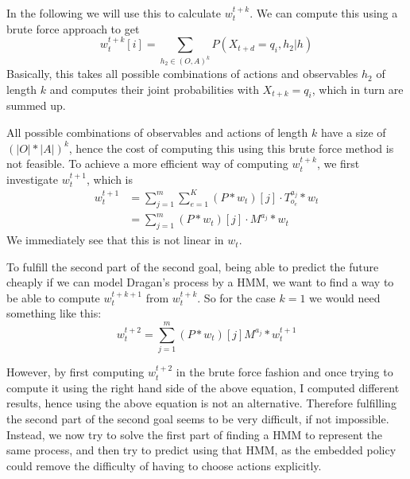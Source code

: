 \documentclass{article}
\theoremstyle{definition}
\begin{document}
In the following we will use this to calculate $w_t^{t+k}$. We can compute this using a brute force approach to get 
\[
w_t^{t+k}[i]=\sum\limits_{h_2 \in (O,A)^k} P(X_{t+d}=q_i,h_2|h) 
\]
Basically, this takes all possible combinations of actions and observables $h_2$ of length $k$ and computes their joint probabilities with $X_{t+k}=q_i$, which in turn are summed up. 

All possible combinations of observables and actions of length $k$ have a size of $(|O|*|A|)^k$, hence the cost of computing this using this brute force method is not feasible. 
To achieve a more efficient way of computing $w_t^{t+k}$, we first investigate $w_t^{t+1}$, which is 
\begin{align*}
w_t^{t+1}&=
\sum\limits_{j=1}^{m} \sum\limits_{e=1}^{K} (P*w_t)[j]\cdot T^{a_j}_{o_e}*w_t \\
&=\sum\limits_{j=1}^{m} (P*w_t)[j] \cdot M^{a_j}*w_t
\end{align*}
We immediately see that this is not linear in $w_t$. 

To fulfill the second part of the second goal, being able to predict the future cheaply if we can model Dragan's process by  a HMM, we want to find a way to be able to compute $w_t^{t+k+1}$ from $w_t^{t+k}$. 
So for the case $k=1$ we would need something like this: 
\[
w_t^{t+2}=\sum\limits_{j=1}^{m} (P*w_t)[j] M^{a_j}*w_t^{t+1}
\]

However, by first computing $w_t^{t+2}$ in the brute force fashion and once trying to compute it using the right hand side of the above equation, I computed different results, hence using the above equation is not an alternative. 
Therefore fulfilling the second part of the second goal seems to be very difficult, if not impossible. Instead, we now try to solve the first part of finding  a HMM to represent the same process, and then try to predict using that HMM, as the embedded policy could remove the difficulty of having to choose actions explicitly. 

\end{document}
